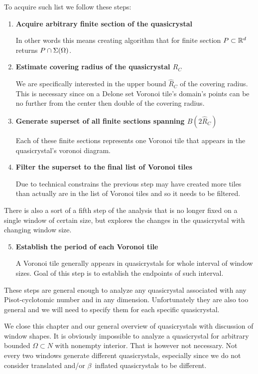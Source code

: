\documentclass[text.tex]{subfiles}
\begin{document}
To acquire such list we follow these steps: 
\begin{enumerate}
\item \textbf{Acquire arbitrary finite section of the quasicrystal}

In other words this means creating algorithm that for finite section $P\subset\mathbb{R}^d$ returns $P\cap\Sigma(\Omega)$. 
\item \textbf{Estimate covering radius of the quasicrystal $R_C$}

We are specifically interested in the upper bound $\hat{R}_C$ of the covering radius. This is necessary since on a Delone set Voronoi tile's domain's points can be no further from the center then double of the covering radius. 
\item \textbf{Generate superset of all finite sections spanning $B(2\hat{R}_C)$}

Each of these finite sections represents one Voronoi tile that appears in the quasicrystal's voronoi diagram. 
\item \textbf{Filter the superset to the final list of Voronoi tiles}

Due to technical constrains the previous step may have created more tiles than actually are in the list of Voronoi tiles and so it needs to be filtered. 
\end{enumerate}

There is also a sort of a fifth step of the analysis that is no longer fixed on a single window of certain size, but explores the changes in the quasicrystal with changing window size. 
\begin{enumerate}
\setcounter{enumi}{4}
\item \textbf{Establish the period of each Voronoi tile}

A Voronoi tile generally appears in quasicrystals for whole interval of window sizes. Goal of this step is to establish the endpoints of such interval. 
\end{enumerate}

These steps are general enough to analyze any quasicrystal associated with any Pisot-cyclotomic number and in any dimension. Unfortunately they are also too general and we will need to specify them for each specific quasicrystal. 

We close this chapter and our general overview of quasicrystals with discussion of window shapes. It is obviously impossible to analyze a quasicrystal for arbitrary bounded $\Omega\subset N$ with nonempty interior. That is however not necessary. Not every two windows generate different quasicrystals, especially since we do not consider translated and/or $\beta$~inflated quasicrystals to be different. 
\end{document}
